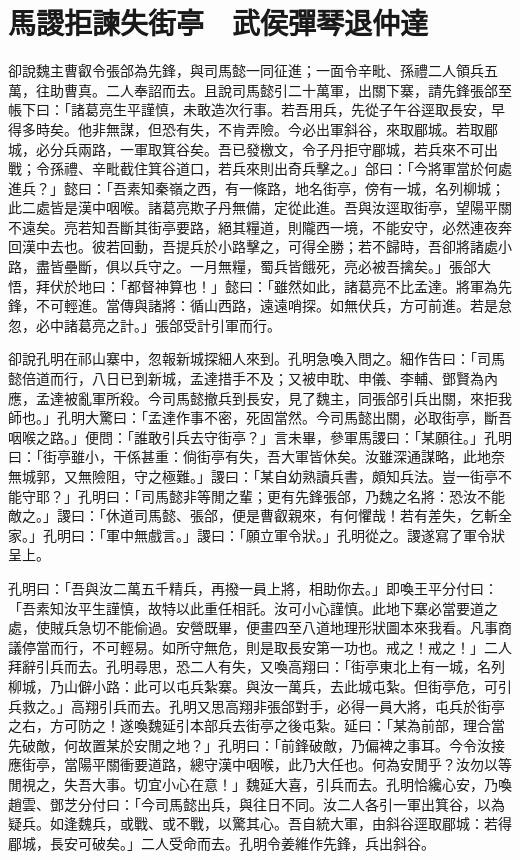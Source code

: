
\chapter{馬謖拒諫失街亭　武侯彈琴退仲達}

卻說魏主曹叡令張郃為先鋒，與司馬懿一同征進；一面令辛毗、孫禮二人領兵五萬，往助曹真。二人奉詔而去。且說司馬懿引二十萬軍，出關下寨，請先鋒張郃至帳下曰：「諸葛亮生平謹慎，未敢造次行事。若吾用兵，先從子午谷逕取長安，早得多時矣。他非無謀，但恐有失，不肯弄險。今必出軍斜谷，來取郿城。若取郿城，必分兵兩路，一軍取箕谷矣。吾已發檄文，令子丹拒守郿城，若兵來不可出戰；令孫禮、辛毗截住箕谷道口，若兵來則出奇兵擊之。」郃曰：「今將軍當於何處進兵？」懿曰：「吾素知秦嶺之西，有一條路，地名街亭，傍有一城，名列柳城；此二處皆是漢中咽喉。諸葛亮欺子丹無備，定從此進。吾與汝逕取街亭，望陽平關不遠矣。亮若知吾斷其街亭要路，絕其糧道，則隴西一境，不能安守，必然連夜奔回漢中去也。彼若回動，吾提兵於小路擊之，可得全勝；若不歸時，吾卻將諸處小路，盡皆壘斷，俱以兵守之。一月無糧，蜀兵皆餓死，亮必被吾擒矣。」張郃大悟，拜伏於地曰：「都督神算也！」懿曰：「雖然如此，諸葛亮不比孟達。將軍為先鋒，不可輕進。當傳與諸將：循山西路，遠遠哨探。如無伏兵，方可前進。若是怠忽，必中諸葛亮之計。」張郃受計引軍而行。

卻說孔明在祁山寨中，忽報新城探細人來到。孔明急喚入問之。細作告曰：「司馬懿倍道而行，八日已到新城，孟達措手不及；又被申耽、申儀、李輔、鄧賢為內應，孟達被亂軍所殺。今司馬懿撤兵到長安，見了魏主，同張郃引兵出關，來拒我師也。」孔明大驚曰：「孟達作事不密，死固當然。今司馬懿出關，必取街亭，斷吾咽喉之路。」便問：「誰敢引兵去守街亭？」言未畢，參軍馬謖曰：「某願往。」孔明曰：「街亭雖小，干係甚重：倘街亭有失，吾大軍皆休矣。汝雖深通謀略，此地奈無城郭，又無險阻，守之極難。」謖曰：「某自幼熟讀兵書，頗知兵法。豈一街亭不能守耶？」孔明曰：「司馬懿非等閒之輩；更有先鋒張郃，乃魏之名將：恐汝不能敵之。」謖曰：「休道司馬懿、張郃，便是曹叡親來，有何懼哉！若有差失，乞斬全家。」孔明曰：「軍中無戲言。」謖曰：「願立軍令狀。」孔明從之。謖遂寫了軍令狀呈上。

孔明曰：「吾與汝二萬五千精兵，再撥一員上將，相助你去。」即喚王平分付曰：「吾素知汝平生謹慎，故特以此重任相託。汝可小心謹慎。此地下寨必當要道之處，使賊兵急切不能偷過。安營既畢，便畫四至八道地理形狀圖本來我看。凡事商議停當而行，不可輕易。如所守無危，則是取長安第一功也。戒之！戒之！」二人拜辭引兵而去。孔明尋思，恐二人有失，又喚高翔曰：「街亭東北上有一城，名列柳城，乃山僻小路：此可以屯兵紮寨。與汝一萬兵，去此城屯紮。但街亭危，可引兵救之。」高翔引兵而去。孔明又思高翔非張郃對手，必得一員大將，屯兵於街亭之右，方可防之！遂喚魏延引本部兵去街亭之後屯紮。延曰：「某為前部，理合當先破敵，何故置某於安閒之地？」孔明曰：「前鋒破敵，乃偏裨之事耳。今令汝接應街亭，當陽平關衝要道路，總守漢中咽喉，此乃大任也。何為安閒乎？汝勿以等閒視之，失吾大事。切宜小心在意！」魏延大喜，引兵而去。孔明恰纔心安，乃喚趙雲、鄧芝分付曰：「今司馬懿出兵，與往日不同。汝二人各引一軍出箕谷，以為疑兵。如逢魏兵，或戰、或不戰，以驚其心。吾自統大軍，由斜谷逕取郿城：若得郿城，長安可破矣。」二人受命而去。孔明令姜維作先鋒，兵出斜谷。

